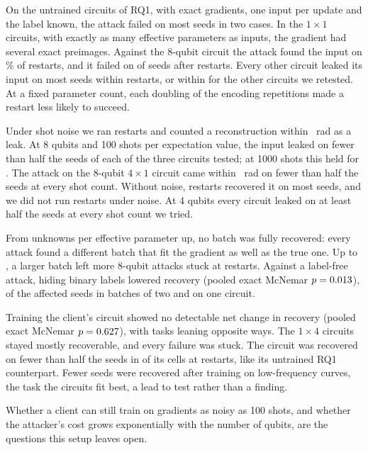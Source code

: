 \documentclass[10pt,conference]{IEEEtran}
\begin{document}
On the untrained circuits of RQ1, with exact gradients, one input per update and the label known,
the attack failed on most seeds in two cases. In the $1\times1$ circuits,
with exactly as many effective parameters as inputs, the gradient had several exact preimages.
Against the 8-qubit
\BudgetHardestCircuit{} circuit the attack found the input on \BudgetHardestRate\% of restarts,
and it failed on \BudgetHardestHeld{} of \Seeds{} seeds after \BudgetRestarts{} restarts. Every other circuit leaked its input on most seeds within \Restarts{} restarts, or within
\BudgetRestarts{} for the other circuits we retested. At a fixed parameter count, each doubling of
the encoding repetitions made a restart less likely to succeed.

Under shot noise we ran \Restarts{} restarts and counted a reconstruction within \CloseRad~rad as a
leak. At 8 qubits and 100 shots per expectation value, the input leaked on fewer than half
the seeds of each of the three circuits tested; at 1000 shots this held for \ShotPrivateAtSecond. The attack on the 8-qubit $4\times1$ circuit came within \CloseRad~rad on
fewer than half the seeds at every shot count. Without noise, \BudgetRestarts{} restarts
recovered it on most seeds, and we did not run \BudgetRestarts{} restarts under noise. At 4 qubits every circuit leaked on at least
half the seeds at every shot count we tried.

From \BatchHeldMinRatio{} unknowns per effective parameter up, no batch was fully recovered:
every attack found a different batch that fit the gradient as well as the true one. Up to
\BatchLeakMaxRatio, a larger batch left more 8-qubit attacks stuck at \Restarts{} restarts. Against
a label-free attack, hiding binary labels lowered recovery (pooled exact McNemar
$p = 0.013$), \LabelKnownOnlyTwo{} of the \LabelKnownOnlyAll{} affected seeds in batches of
two and \LabelKnownOnlyTop{} on one circuit.

Training the client's circuit showed no detectable net change in recovery (pooled exact McNemar
$p = 0.627$), with tasks leaning opposite ways. The $1\times4$ circuits stayed mostly recoverable, and every failure was
stuck. The \TrainedDeepCircuit{} circuit was recovered on fewer than half the seeds in
\TrainedDeepBelowHalf{} of its \TrainedDeepCells{} cells at \Restarts{} restarts, like its untrained
RQ1 counterpart. Fewer seeds were recovered after training on low-frequency curves, the task the circuits
fit best, a lead to test rather than a finding.

Whether a client can still train on gradients as noisy as 100 shots, and whether the attacker's cost
grows exponentially with the number of qubits, are the questions this setup leaves open.



\end{document}
